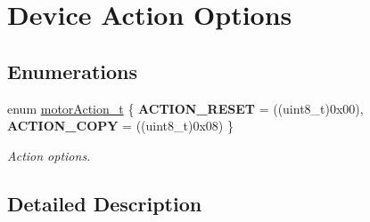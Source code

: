 \hypertarget{group___device___action___options}{}\section{Device Action Options}
\label{group___device___action___options}
\subsection*{Enumerations}
\begin{DoxyCompactItemize}
\item 
\mbox{\label{group___device___action___options_ga5b2358a9ba8742cb555ddc5b37508500}} 
enum \mbox{\hyperlink{group___device___action___options_ga5b2358a9ba8742cb555ddc5b37508500}{motor\+Action\+\_\+t}} \{ {\bfseries A\+C\+T\+I\+O\+N\+\_\+\+R\+E\+S\+ET} = ((uint8\+\_\+t)0x00), 
{\bfseries A\+C\+T\+I\+O\+N\+\_\+\+C\+O\+PY} = ((uint8\+\_\+t)0x08)
 \}
\begin{DoxyCompactList}\small\item\em Action options. \end{DoxyCompactList}\end{DoxyCompactItemize}


\subsection{Detailed Description}
